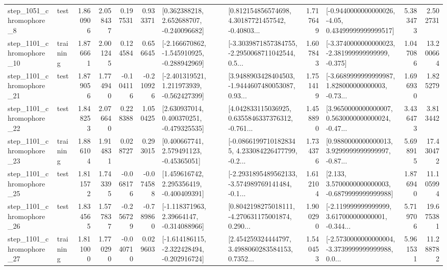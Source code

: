 \begin{tabular}{llrrrrllrlrr}
  step\_1051\_chromophore\_8 &      test &      1.860906 &    2.058437 &      0.197531 &  0.933371 &    [0.362388218, 2.652688707, -0.240096682] &  [0.812154856574698, 4.30187721457542, -0.40803... &       1.717649 &  [-0.9440000000000026, -4.05, 0.43499999999999517] &            5.383473 &          2.502731 \\
 step\_1101\_chromophore\_10 &  training &      1.876661 &    2.001245 &      0.124584 &  0.656645 &  [-2.166670862, -1.545910925, -0.288942969] &  [-3.3039871857384755, -2.2950068711042544, 0.5... &       1.607843 &  [-3.3740000000000023, -2.381999999999999, -0.375] &            1.047086 &         13.200664 \\
 step\_1101\_chromophore\_21 &      test &      1.879056 &    1.774940 &     -0.104116 & -0.210926 &   [-2.401319521, 1.211973939, -0.562427399] &  [3.9488903428404503, -1.9444607480053087, 0.93... &       1.751419 &  [-3.6689999999999987, 1.828000000000003, -0.73... &            1.696930 &          1.825279 \\
 step\_1101\_chromophore\_22 &      test &      1.848253 &    2.076640 &      0.228388 &  1.050425 &    [2.630937014, 0.400370251, -0.479325535] &  [4.042833115036925, 0.6355846337376312, -0.761... &       1.458890 &  [3.9650000000000007, 0.5630000000000024, -0.47... &            3.436473 &          3.813442 \\
 step\_1101\_chromophore\_23 &  training &      1.886104 &    1.914831 &      0.028727 &  0.293015 &     [0.400667741, 2.579491123, -0.45365051] &  [-0.08661997101828345, 4.233084226477799, -0.2... &       1.734376 &  [0.9880000000000013, 3.9299999999999997, -0.87... &            5.698915 &         17.430472 \\
 step\_1101\_chromophore\_25 &      test &      1.811572 &    1.743395 &     -0.068176 & -0.074588 &    [1.459616742, 2.295356419, -0.400409391] &  [-2.2931895489562133, -3.574989769141484, -0.1... &       1.612104 &   [2.133, 3.5700000000000003, -0.6879999999999988] &            1.876940 &         11.105994 \\
 step\_1101\_chromophore\_26 &      test &      1.834565 &    1.577837 &     -0.256729 & -0.789860 &    [-1.118371963, 2.39664147, -0.314088966] &  [0.8042198275018111, -4.270631175001874, 0.290... &       1.900290 &  [-2.119999999999999, 3.617000000000001, -0.344... &            5.719706 &         19.675381 \\
 step\_1101\_chromophore\_27 &  training &      1.811000 &    1.770290 &     -0.040710 &  0.029603 &  [-1.614186115, -2.322428494, -0.202916724] &  [2.454259324444797, 3.4988060283584153, 0.7352... &       1.540453 &  [-2.5730000000000004, -3.3739999999999988, 0.0... &            5.961531 &         11.288782 \\

\end{tabular}
